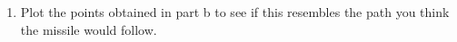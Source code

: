 \begin{embeddedproblem}{}
\begin{enumerate}[label={\bf{}(\alph*)}]
  \item Plot the points obtained in part b to see if this resembles the
    path you think the missile would follow.
  \end{enumerate}
\end{embeddedproblem}

